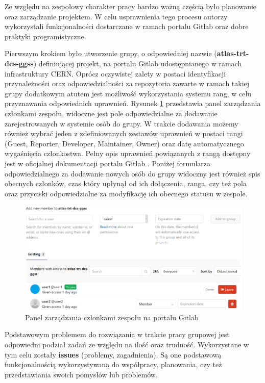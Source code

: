 Ze względu na zespołowy charakter pracy bardzo ważną częścią było planowanie oraz zarządzanie projektem. W celu usprawnienia tego procesu autorzy wykorzystali funkcjonalności dostarczane w ramach portalu Gitlab oraz dobre praktyki programistyczne.

Pierwszym krokiem było utworzenie grupy, o odpowiedniej nazwie (\textbf{atlas-trt-dcs-ggss}) definiującej projekt, na portalu Gitlab udostępnianego w ramach infrastruktury CERN. Oprócz oczywistej zalety w postaci identyfikacji przynależności oraz odpowiedzialności za repozytoria zawarte w ramach takiej grupy dodatkowym atutem jest możliwość wykorzystania systemu rang, w celu przyznawania odpowiednich uprawnień. Rysunek \ref{fig:memMan} przedstawia panel zarządzania członkami zespołu, widoczne jest pole odpowiedzialne za dodawanie zarejestrowanych w systemie osób do grupy. W trakcie dodawania możemy również wybrać jeden z zdefiniowanych zestawów uprawnień w postaci rangi (Guest, Reporter, Developer, Maintainer, Owner) oraz datę automatycznego wygaśnięcia członkostwa. Pełny opis uprawnień powiązanych z rangą dostępny jest w oficjalnej dokumentacji portalu Gitlab \cite{GitLabPermissions}. Poniżej formularza odpowiedzialnego za dodawanie nowych osób do grupy widoczny jest również spis obecnych członków, czas który upłynął od ich dołączenia, ranga, czy też pola oraz przyciski odpowiedzialne za modyfikację ich obecnego statusu w zespole.

\begin{figure}[H]
\centering
\caption{Panel zarządzania członkami zespoł{}u na portalu Gitlab}
\label{fig:memMan}
\includegraphics[width=\textwidth]{res/png/memberManagementPanel}
\end{figure}


Podstawowym problemem do rozwiązania w trakcie pracy grupowej jest odpowiedni podział zadań ze względu na ilość oraz trudność. Wykorzystane w tym celu zostały \textbf{issues} (problemy, zagadnienia). Są one podstawową funkcjonalnością wykorzystywaną do współpracy, planowania, czy też przedstawiania swoich pomysłów lub problemów.

